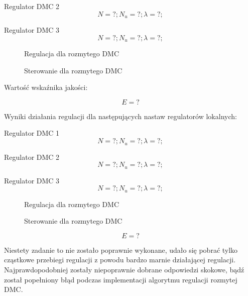 Regulator DMC 2
\begin{equation}
N = ?; 
N_u = ?; 
\lambda = ?; 
\end{equation}

Regulator DMC 3
\begin{equation}
N = ?; 
N_u = ?; 
\lambda = ?; 
\end{equation}


\begin{figure}[H]
\centering

\caption {Regulacja dla rozmytego DMC}
\end{figure}

\begin{figure}[H]
\centering

\caption{Sterowanie dla rozmytego DMC}
\end{figure}

Wartość wskaźnika jakości:

\begin{equation}
E = ?
\end{equation}

Wyniki działania regulacji dla następujących nastaw regulatorów lokalnych:

Regulator DMC 1
\begin{equation}
N = ?; 
N_u = ?; 
\lambda = ?; 
\end{equation}

Regulator DMC 2
\begin{equation}
N = ?; 
N_u = ?; 
\lambda = ?; 
\end{equation}

Regulator DMC 3
\begin{equation}
N = ?; 
N_u = ?; 
\lambda = ?; 
\end{equation}

\begin{figure}[H]
\centering

\caption{Regulacja dla rozmytego DMC}
\end{figure}

\begin{figure}[H]
\centering

\caption{Sterowanie dla rozmytego DMC}
\end{figure}

\begin{equation}
E = ?
\end{equation}

 Niestety zadanie to nie zostało poprawnie wykonane, udało się pobrać tylko cząstkowe przebiegi regulacji z powodu bardzo marnie działającej regulacji. Najprawdopodobniej zostały niepoprawnie dobrane odpowiedzi skokowe, bądź został popełniony błąd podczas implementacji algorytmu regulacji rozmytej DMC.